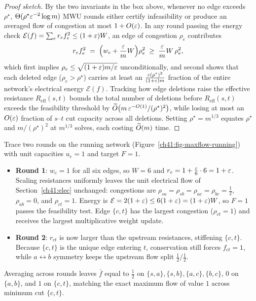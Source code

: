 \begin{proof}[Proof sketch]
By the two invariants in the box above, whenever no edge exceeds $\rho^\star$, $\Theta(\rho^\star \varepsilon^{-2}\log m)$ MWU rounds either certify infeasibility or produce an averaged flow of congestion at most $1 + O(\varepsilon)$. In any round passing the energy check $\mathcal{E}(f) = \sum_e r_e f_e^2 \le (1+\varepsilon)W$, an edge of congestion $\rho_e$ contributes
\[
  r_e f_e^2 \;=\; \Bigl(w_e + \frac{\varepsilon}{m}W\Bigr)\rho_e^2 \;\ge\; \frac{\varepsilon}{m}W\,\rho_e^2 ,
\]
which first implies $\rho_e \le \sqrt{(1+\varepsilon)m/\varepsilon}$ unconditionally, and second shows that each deleted edge ($\rho_e > \rho^\star$) carries at least an $\frac{\varepsilon (\rho^\star)^2}{(1+\varepsilon)m}$ fraction of the entire network's electrical energy $\mathcal{E}(f)$. Tracking how edge deletions raise the effective resistance $R_{\mathrm{eff}}(s,t)$ bounds the total number of deletions before $R_{\mathrm{eff}}(s,t)$ exceeds the feasibility threshold by $\widetilde{O}\bigl(m\,\varepsilon^{-O(1)} / (\rho^\star)^2\bigr)$, while losing at most an $O(\varepsilon)$ fraction of $s$--$t$ cut capacity across all deletions. Setting $\rho^\star = m^{1/3}$ equates $\rho^\star$ and $m/(\rho^\star)^2$ at $m^{1/3}$ solves, each costing $\widetilde{O}(m)$ time.
\end{proof}

\begin{labbox}
Trace two rounds on the running network (Figure~\ref{ch41:fig-maxflow-running}) with unit capacities $u_e=1$ and target $F=1$.
\begin{itemize}
  \item \textbf{Round 1}: $w_e=1$ for all six edges, so $W=6$ and $r_e = 1 + \frac{\varepsilon}{6}\cdot 6 = 1+\varepsilon$. Scaling resistances uniformly leaves the unit electrical flow of Section~\ref{ch41:elec} unchanged: congestions are $\rho_{sa}=\rho_{sb}=\rho_{ac}=\rho_{bc}=\tfrac{1}{2}$, $\rho_{ab}=0$, and $\rho_{ct}=1$. Energy is $\mathcal{E}=2(1+\varepsilon) \le 6(1+\varepsilon) = (1+\varepsilon)W$, so $F=1$ passes the feasibility test. Edge $\{c,t\}$ has the largest congestion ($\rho_{ct}=1$) and receives the largest multiplicative weight update.
  \item \textbf{Round 2}: $r_{ct}$ is now larger than the upstream resistances, stiffening $\{c,t\}$. Because $\{c,t\}$ is the unique edge entering $t$, conservation still forces $f_{ct}=1$, while $a\leftrightarrow b$ symmetry keeps the upstream flow split $\tfrac{1}{2}/\tfrac{1}{2}$.
\end{itemize}
Averaging across rounds leaves $\bar{f}$ equal to $\tfrac{1}{2}$ on $\{s,a\},\{s,b\},\{a,c\},\{b,c\}$, $0$ on $\{a,b\}$, and $1$ on $\{c,t\}$, matching the exact maximum flow of value $1$ across minimum cut $\{c,t\}$.
\end{labbox}

